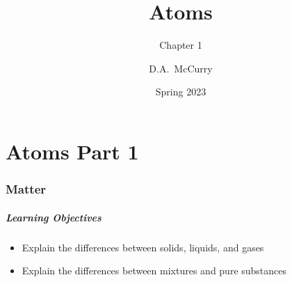 \documentclass[notes=only]{beamer}
\title{Atoms}
\subtitle{Chapter 1}
\institute[CHEM115 Bloomsburg University]{CHEM115 --- Chemistry for the Sciences I \\ Bloomsburg University}
\author{D.A.\ McCurry}
\date{Spring 2023}
\begin{document}
\maketitle

\part{Atoms Part 1}

\section{Matter}

\begin{frame}
	\frametitle{Learning Objectives}

	\begin{itemize}
		\item Explain the differences between solids, liquids, and gases
		\item Explain the differences between mixtures and pure
			substances
	\end{itemize}
\end{frame}


%
\end{document}
